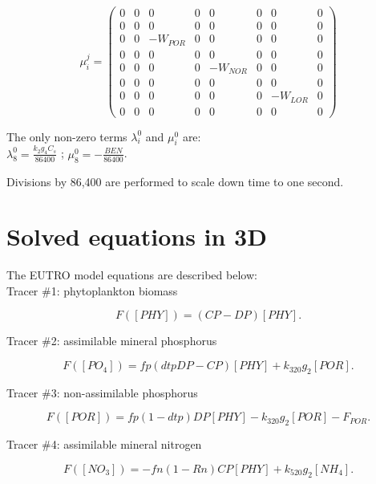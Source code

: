 $$
  \mu_i^j =
  \begin{pmatrix}
   0 & 0 & 0 & 0 & 0 & 0 & 0 & 0 \\
   0 & 0 & 0 & 0 & 0 & 0 & 0 & 0 \\
   0 & 0 & -W_{POR} & 0 & 0 & 0 & 0 & 0 \\
   0 & 0 & 0 & 0 & 0 & 0 & 0 & 0 \\
   0 & 0 & 0 & 0 & -W_{NOR} & 0 & 0 & 0 \\
   0 & 0 & 0 & 0 & 0 & 0 & 0 & 0 \\
   0 & 0 & 0 & 0 & 0 & 0 & -W_{LOR} & 0 \\
   0 & 0 & 0 & 0 & 0 & 0 & 0 & 0
  \end{pmatrix}
$$

The only non-zero terms $\lambda_i^0$ and $\mu_i^0$ are:\\

$\lambda_8^0 = \frac{k_2 g_4 C_s}{86400}$ ; $\mu_8^0 = -\frac{BEN}{86400}$.

Divisions by 86,400 are performed to scale down time to one second.

\section{Solved equations in 3D}

The EUTRO model equations are described below:\\

Tracer $\#$1: phytoplankton biomass

\begin{equation}
  F([PHY]) = (CP-DP) [PHY].
\end{equation}

Tracer $\#$2: assimilable mineral phosphorus

\begin{equation}
  F([PO_4]) = fp(dtp DP - CP) [PHY] + k_{320} g_2 [POR].
\end{equation}

Tracer $\#$3: non-assimilable phosphorus

\begin{equation}
  F([POR]) = fp(1-dtp) DP [PHY] - k_{320} g_2 [POR] - F_{POR}.
\end{equation}

Tracer $\#$4: assimilable mineral nitrogen

\begin{equation}
  F([NO_3]) = - fn (1- Rn) CP [PHY] + k_{520} g_2 [NH_4].
\end{equation}


